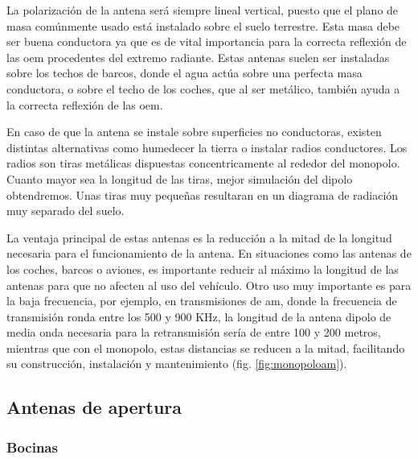 \par La polarización de la antena será siempre lineal vertical, puesto que el plano de masa comúnmente usado está instalado sobre el suelo terrestre. Esta masa debe ser buena conductora ya que es de vital importancia para la correcta reflexión de las \gls{oem} procedentes del extremo radiante. Estas antenas suelen ser instaladas sobre los techos de barcos, donde el agua actúa sobre una perfecta masa conductora, o sobre el techo de los coches, que al ser metálico, también ayuda a la correcta reflexión de las \gls{oem}. 
\\

\par En caso de que la antena se instale sobre superficies no conductoras, existen distintas alternativas como humedecer la tierra o instalar radios conductores. Los radios son tiras metálicas dispuestas concentricamente al rededor del monopolo. Cuanto mayor sea la longitud de las tiras, mejor simulación del dipolo obtendremos. Unas tiras muy pequeñas resultaran en un diagrama de radiación muy separado del suelo.
\\
\par La ventaja principal de estas antenas es la reducción a la mitad de la longitud necesaria para el funcionamiento de la antena. En situaciones como las antenas de los coches, barcos o aviones, es importante reducir al máximo la longitud de las antenas para que no afecten al uso del vehículo. Otro uso muy importante es para la baja frecuencia, por ejemplo, en transmisiones de \gls{am}, donde la frecuencia de transmisión ronda entre los 500 y 900 KHz, la longitud de la antena dipolo de media onda necesaria para la retransmisión sería de entre 100 y 200 metros, mientras que con el monopolo, estas distancias se reducen a la mitad, facilitando su construcción, instalación y mantenimiento (fig. \ref{fig:monopoloam}).



\subsection{Antenas de apertura}
\subsubsection{Bocinas}

